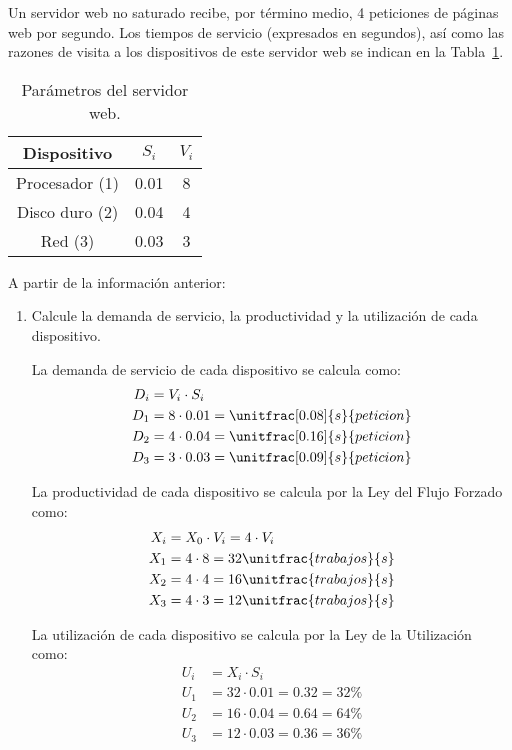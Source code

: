 \begin{ejercicio}\label{ej:5.26}
    Un servidor web no saturado recibe, por término medio, 4 peticiones de páginas web por segundo. Los tiempos de servicio (expresados en segundos), así como las razones de visita a los dispositivos de este servidor web se indican en la Tabla~\ref{tab:5.26}.
    \begin{table}[h]
        \centering
        \begin{tabular}{|c|c|c|}
            \hline
            Dispositivo & $S_i$ & $V_i$ \\
            \hline
            Procesador (1) & 0.01 & 8 \\
            Disco duro (2) & 0.04 & 4 \\
            Red (3) & 0.03 & 3 \\
            \hline
        \end{tabular}
        \caption{Parámetros del servidor web.}
        \label{tab:5.26}
    \end{table}
    A partir de la información anterior:
    \begin{enumerate}
        \item Calcule la demanda de servicio, la productividad y la utilización de cada dispositivo.
        
        La demanda de servicio de cada dispositivo se calcula como:
        \begin{align*}
            D_i &= V_i \cdot S_i\\
            D_1 &= 8 \cdot 0.01 = \unitfrac[0.08]{s}{peticion} \\
            D_2 &= 4 \cdot 0.04 = \unitfrac[0.16]{s}{peticion} \\
            D_3 &= 3 \cdot 0.03 = \unitfrac[0.09]{s}{peticion}
        \end{align*}

        La productividad de cada dispositivo se calcula por la Ley del Flujo Forzado como:
        \begin{align*}
            X_i &= X_0 \cdot V_i = 4 \cdot V_i\\
            X_1 &= 4 \cdot 8 = 32 \unitfrac{trabajos}{s} \\
            X_2 &= 4 \cdot 4 = 16 \unitfrac{trabajos}{s} \\
            X_3 &= 4 \cdot 3 = 12 \unitfrac{trabajos}{s}
        \end{align*}

        La utilización de cada dispositivo se calcula por la Ley de la Utilización como:
        \begin{align*}
            U_i &= X_i \cdot S_i\\
            U_1 &= 32 \cdot 0.01 = 0.32 = 32\% \\
            U_2 &= 16 \cdot 0.04 = 0.64 = 64\% \\
            U_3 &= 12 \cdot 0.03 = 0.36 = 36\%
        \end{align*}
        

\end{enumerate}
\end{ejercicio}
